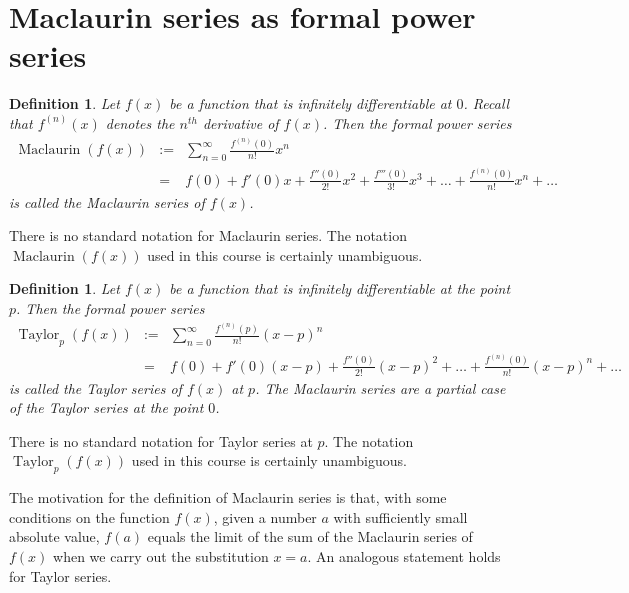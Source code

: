 \documentclass[12pt]{book}
\newcommand{\eqdef}{\textbf{:=}}
\newtheorem{definition}[theorem]{Definition}
\DeclareMathOperator{\maclaurin}{Maclaurin}
\DeclareMathOperator{\taylor}{Taylor}
\begin{document}
\section{Maclaurin series as formal power series}\label{secMaclaurinSeries}
\begin{definition}\label{defMaclaurinSeries}
 Let $f(x)$ be a function that is infinitely differentiable at $0$. Recall that $f^{(n)}(x)$ denotes the $n^{th}$ derivative of $f(x)$. Then the formal power series
\begin{equation}\label{eqMacLaurinDef}
\begin{array}{rcl}
\maclaurin (f(x))&\eqdef&\displaystyle \sum_{n=0}^{\infty}  \frac{f^{(n)} (0)}{n!} x^n\\
&=& \displaystyle f(0)+f'(0)x+\frac{f''(0)}{2!}x^2+\frac{f'''(0)}{3!}x^3+\dots+\frac{f^{(n)}(0)}{n!}x^n+\dots
\end{array}
\end{equation}
is called the Maclaurin series of $f(x)$. 
\end{definition}
There is no standard notation for Maclaurin series. The notation $\maclaurin (f(x))$ used in this course is certainly unambiguous.

\begin{definition}\label{defTaylorSeries}
 Let $f(x)$ be a function that is infinitely differentiable at the point $p$. Then the formal power series
\begin{equation}\label{eqTaylorDef}
\begin{array}{rcl}
\taylor_p (f(x))&\eqdef&\displaystyle \sum_{n=0}^{\infty}  \frac{f^{(n)} (p)}{n!} (x-p)^n\\&=& \displaystyle f(0)+f'(0)(x-p)+\frac{f''(0)}{2!}(x-p)^2+\dots+\frac{f^{(n)}(0)}{n!}(x-p)^n+\dots
\end{array}
\end{equation}
is called the Taylor series of $f(x)$ at $p$. The Maclaurin series are a partial case of the Taylor series at the point $0$.
\end{definition}
There is no standard notation for Taylor series at $p$. The notation $\taylor_p(f(x))$ used in this course is certainly unambiguous.

The motivation for the definition of Maclaurin series is that, with some conditions on the function $f(x)$, given a number $a$ with sufficiently small absolute value, $f(a)$ equals the limit of the sum of the Maclaurin series of $f(x)$ when we carry out the substitution $x=a$. An analogous statement holds for Taylor series.
\end{document}
